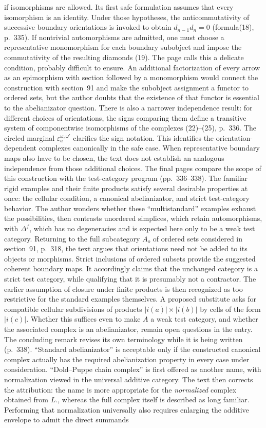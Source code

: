 \documentclass[10pt,oneside]{book}
\begin{document}
if isomorphisms are allowed. Its first safe formulation assumes that every isomorphism is an identity. Under those hypotheses, the anticommutativity of successive boundary orientations is invoked to obtain $d_{n-1}d_n=0$ (formula(18), p.~335). If nontrivial automorphisms are admitted, one must choose a representative monomorphism for each boundary subobject and impose the commutativity of the resulting diamonds (19). The page calls this a delicate condition, probably difficult to ensure. An additional factorization of every arrow as an epimorphism with section followed by a monomorphism would connect the construction with section~91 and make the subobject assignment a functor to ordered sets, but the author doubts that the existence of that functor is essential to the abelianizator question. There is also a narrower independence result: for different choices of orientations, the signs comparing them define a transitive system of componentwise isomorphisms of the complexes (22)--(25), p.~336. The circled marginal $\varepsilon_a^{\omega,\omega'}$ clarifies the sign notation. This identifies the orientation-dependent complexes canonically in the safe case. When representative boundary maps also have to be chosen, the text does not establish an analogous independence from those additional choices. The final pages compare the scope of this construction with the test-category program (pp.~336--338). The familiar rigid examples and their finite products satisfy several desirable properties at once: the cellular condition, a canonical abelianizator, and strict test-category behavior. The author wonders whether these ``multistandard'' examples exhaust the possibilities, then contrasts unordered simplices, which retain automorphisms, with $\Delta^f$, which has no degeneracies and is expected here only to be a weak test category. Returning to the full subcategory $A_o$ of ordered sets considered in section~91, p.~318, the text argues that orientations need not be added to its objects or morphisms. Strict inclusions of ordered subsets provide the suggested coherent boundary maps. It accordingly claims that the unchanged category is a strict test category, while qualifying that it is presumably not a contractor. The earlier assumption of closure under finite products is then recognized as too restrictive for the standard examples themselves. A proposed substitute asks for compatible cellular subdivisions of products $|i(a)|\times|i(b)|$ by cells of the form $|i(c)|$. Whether this suffices even to make $A$ a weak test category, and whether the associated complex is an abelianizator, remain open questions in the entry. The concluding remark revises its own terminology while it is being written (p.~338). ``Standard abelianizator'' is acceptable only if the constructed canonical complex actually has the required abelianization property in every case under consideration. ``Dold--Puppe chain complex'' is first offered as another name, with normalization viewed in the universal additive category. The text then corrects the attribution: the name is more appropriate for the \emph{normalized} complex obtained from $L.$, whereas the full complex itself is described as long familiar. Performing that normalization universally also requires enlarging the additive envelope to admit the direct summands 
\end{document}
